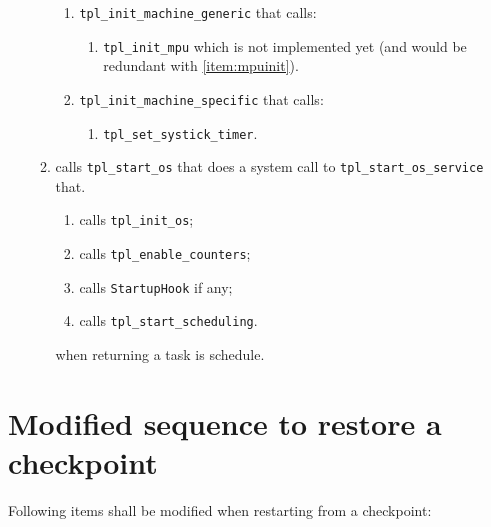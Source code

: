 \documentclass[11pt, oneside]{article}   	%
\begin{document}
\begin{enumerate}
\begin{enumerate}
		\begin{enumerate}
		\item \lstinline{tpl_init_machine_generic} that calls:
			\begin{enumerate}
				\item \lstinline{tpl_init_mpu} which is not implemented yet (and would be redundant with \ref{item:mpuinit}).
			\end{enumerate}
		\item \lstinline{tpl_init_machine_specific} that calls:
			\begin{enumerate}
				\item \lstinline{tpl_set_systick_timer}.
			\end{enumerate}
		\end{enumerate}
	\item calls \lstinline{tpl_start_os} that does a system call to \lstinline{tpl_start_os_service} that.
		\begin{enumerate}
		\item calls \lstinline{tpl_init_os};
		\item calls \lstinline{tpl_enable_counters};
		\item calls \lstinline{StartupHook} if any;
		\item calls \lstinline{tpl_start_scheduling}.
		\end{enumerate}
		when returning a task is schedule.
	\end{enumerate}
\end{enumerate}

\section{Modified sequence to restore a checkpoint}\label{sec:checkpointrestore}

Following items shall be modified when restarting from a checkpoint:
\end{document}
